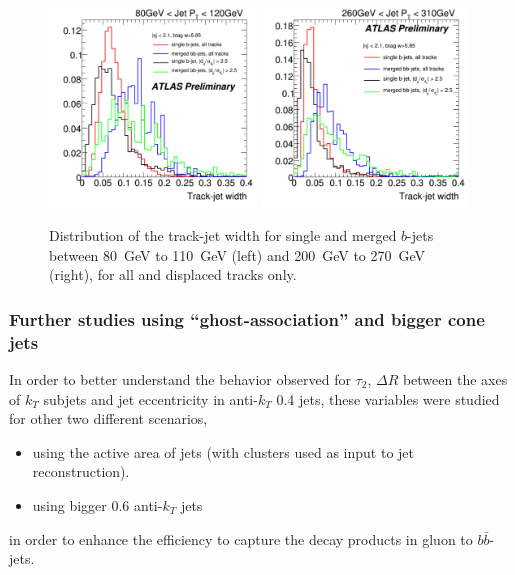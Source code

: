 \begin{figure}[tp]
\centering
\includegraphics[width=0.49\textwidth]{FIGS/TEMPFigs/DisplacedTracks/trkWidth_singlemerged_AllandDisplaced_80-120.pdf}
\includegraphics[width=0.49\textwidth]{FIGS/TEMPFigs/DisplacedTracks/trkWidth_singlemerged_AllandDisplaced_260-310.pdf}
\caption{Distribution of the track-jet width for single and merged $b$-jets between 80~GeV to 110~GeV (left) and 200~GeV to 270~GeV (right), for all and displaced tracks only.}
\label{fig:displacedtrkwidth}
\end{figure}


\subsubsection{Further studies using ``ghost-association'' and bigger cone jets}

In order to better understand the behavior observed for $\tau_2$, $\Delta R$ between the axes of $k_T$ subjets and jet eccentricity in anti-$k_T$ 0.4 jets, these variables were studied for other two different scenarios,

\begin{itemize}\addtolength{\itemsep}{-0.4\baselineskip}
\item 
using the active area of jets (with clusters used as input to jet reconstruction).
\item
using bigger 0.6 anti-$k_T$ jets
\end{itemize}
%
in order to enhance the efficiency to capture the decay products in gluon to $b \bar{b}$-jets.

